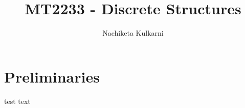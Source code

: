 \documentclass[12pt, oneside]{book}
\date{}
\title{MT2233 - Discrete Structures}
\author{Nachiketa Kulkarni}
\begin{document}
\maketitle
\tableofcontents

\mainmatter
\chapter{Preliminaries}
test text
\end{document}

